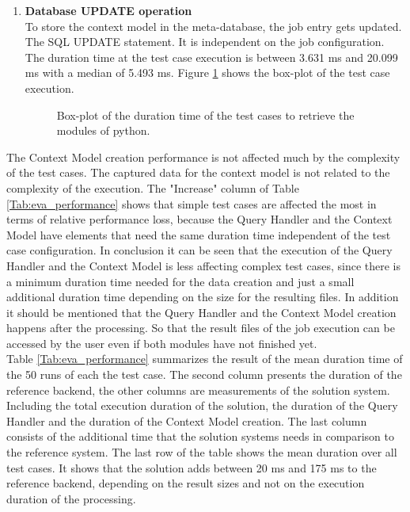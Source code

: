\documentclass[draft,final]{vutinfth} %
\begin{document}
\begin{enumerate}
	\item \textbf{Database UPDATE operation} \\
	To store the context model in the meta-database, the job entry gets updated. The SQL UPDATE statement. It is independent on the job configuration. The duration time at the test case execution is between 3.631 ms and 20.099 ms with a median of 5.493 ms. Figure \ref{fig:evaluation_perf_database} shows the box-plot of the test case execution. 
	
	\begin{figure}[!h]
		\centering
		\caption{Box-plot of the duration time of the test cases to retrieve the modules of python.}
		\label{fig:evaluation_perf_database}		
	\end{figure}
	
\end{enumerate}

The Context Model creation performance is not affected much by the complexity of the test cases. The captured data for the context model is not related to the complexity of the execution. The "Increase" column of Table \ref{Tab:eva_performance} shows that simple test cases are affected the most in terms of relative performance loss, because the Query Handler and the Context Model have elements that need the same duration time independent of the test case configuration. In conclusion it can be seen that the execution of the Query Handler and the Context Model is less affecting complex test cases, since there is a minimum duration time needed for the data creation and just a small additional duration time depending on the size for the resulting files. In addition it should be mentioned that the Query Handler and the Context Model creation happens after the processing. So that the result files of the job execution can be accessed by the user even if both modules have not finished yet. \\
Table \ref{Tab:eva_performance} summarizes the result of the mean duration time of the 50 runs of each the test case. The second column presents the duration of the reference backend, the other columns are measurements of the solution system. Including the total execution duration of the solution, the duration of the Query Handler and the duration of the Context Model creation. The last column consists of the additional time that the solution systems needs in comparison to the reference system. The last row of the table shows the mean duration over all test cases. It shows that the solution adds between 20 ms and 175 ms to the reference backend, depending on the result sizes and not on the execution duration of the processing.
\end{document}
